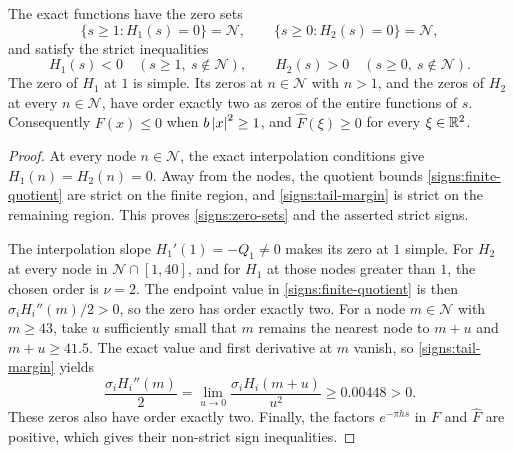 \begin{proposition}\label{signs:global}
The exact functions have the zero sets
\begin{equation}\label{signs:zero-sets}
 \{s\ge1:H_1(s)=0\}=\mathcal N,\qquad
 \{s\ge0:H_2(s)=0\}=\mathcal N,
\end{equation}
and satisfy the strict inequalities
\[
 H_1(s)<0\quad(s\ge1,\ s\notin\mathcal N),\qquad
 H_2(s)>0\quad(s\ge0,\ s\notin\mathcal N).
\]
The zero of $H_1$ at $1$ is simple.  Its zeros at $n\in\mathcal N$ with
$n>1$, and the zeros of $H_2$ at every $n\in\mathcal N$, have order exactly
two as zeros of the entire functions of $s$.
Consequently $F(x)\le0$ when $b\left\lvert x\right\rvert^2\ge1$, and
$\widehat F(\xi)\ge0$ for every $\xi\in\mathbb R^2$.
\end{proposition}

\begin{proof}
At every node $n\in\mathcal N$, the exact interpolation conditions give
$H_1(n)=H_2(n)=0$.  Away from the nodes, the quotient bounds
\eqref{signs:finite-quotient} are strict on the finite region, and
\eqref{signs:tail-margin} is strict on the remaining region.  This proves
\eqref{signs:zero-sets} and the asserted strict signs.

The interpolation slope $H_1'(1)=-Q_1\ne0$ makes its zero at $1$ simple.
For $H_2$ at every node in $\mathcal N\cap[1,40]$, and for $H_1$ at those
nodes greater than $1$, the chosen order is $\nu=2$.
The endpoint value in \eqref{signs:finite-quotient} is then
$\sigma_iH_i''(m)/2>0$, so the zero has order exactly two.
For a node $m\in\mathcal N$ with $m\ge43$, take $u$ sufficiently small that
$m$ remains the nearest node to $m+u$ and $m+u\ge41.5$.  The exact value and first derivative
at $m$ vanish, so \eqref{signs:tail-margin} yields
\[
 \frac{\sigma_iH_i''(m)}2
 =\lim_{u\to0}\frac{\sigma_iH_i(m+u)}{u^2}
 \ge0.00448>0.
\]
These zeros also have order exactly two.  Finally, the factors
$e^{-\pi h s}$ in $F$ and $\widehat F$ are positive, which gives their
non-strict sign inequalities.
\end{proof}
